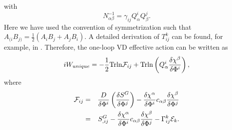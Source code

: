 \documentclass[a4paper,aps,preprint,groupedaddress,showpacs]{revtex4}
\begin{document}
with
\begin{equation}
N^{-1}_{\alpha\beta}=\gamma_{ij}Q^{i}_{\alpha}Q^{j}_{\beta}.
\end{equation}
Here we have used the convention of symmetrization such that
$A_{(i}B_{j)}=\frac{1}{2}(A_{i}B_{j}+A_{j}B_{i})$. A detailed
derivation of $T^{k}_{ij}$ can be found, for example, in \cite{GK}. 
Therefore, the one-loop VD effective action can
be written as
\begin{equation}
iW_{unique}=-\frac{1}{2}{\rm Trln}{\cal F}_{ij}+
{\rm Trln}\left(Q^{i}_{\alpha}
\frac{\delta\chi^{\beta}}{\delta\Phi^{i}}\right),
\label{VDEA}
\end{equation}
where
\begin{eqnarray}
{\cal F}_{ij}&=&\frac{D}{\delta\Phi^{i}}
\left(\frac{\delta S^{G}}{\delta\Phi^{j}}\right)-
\frac{\delta\chi^{\alpha}}{\delta\Phi^{i}}c_{\alpha\beta}
\frac{\delta\chi^{\beta}}{\delta\Phi^{j}}\nonumber\\
&=&S^{G}_{,ij}-
\frac{\delta\chi^{\alpha}}{\delta\Phi^{i}}c_{\alpha\beta}
\frac{\delta\chi^{\beta}}{\delta\Phi^{j}}-
\Gamma^{k}_{ij}{\cal E}_{k}.
\end{eqnarray}
\end{document}
